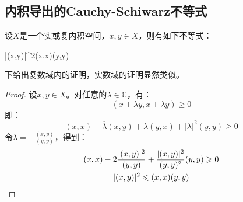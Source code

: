 \subsection{内积导出的Cauchy-Schiwarz不等式}
\begin{theorem}
	设$X$是一个实或复内积空间，$x,y\in X$，则有如下不等式：
	\begin{inequality*}\label{ineq:cauchy-schiwarz-inner-product}
		|(x,y)|^2\leqslant(x,x)(y,y)
	\end{inequality*}
\end{theorem}
下给出复数域内的证明，实数域的证明显然类似。
\begin{proof}
	设$x,y\in X$。对任意的$\lambda\in\mathbb{C}$，有：
	\begin{equation*}
		(x+\lambda y,x+\lambda y)\geqslant 0
	\end{equation*}
	即：
	\begin{equation*}
		(x,x)+\overline{\lambda}(x,y)+\lambda(y,x)+|\lambda|^2(y,y)\geqslant 0
	\end{equation*}
	令$\lambda=-\frac{(x,y)}{(y,y)}$，得到：
	\begin{gather*}
		(x,x)-2\frac{|(x,y)|^2}{(y,y)}+\frac{|(x,y)|^2}{(y,y)^2}(y,y)\geqslant0 \\
		|(x,y)|^2\leqslant(x,x)(y,y)\qedhere
	\end{gather*}
\end{proof}

